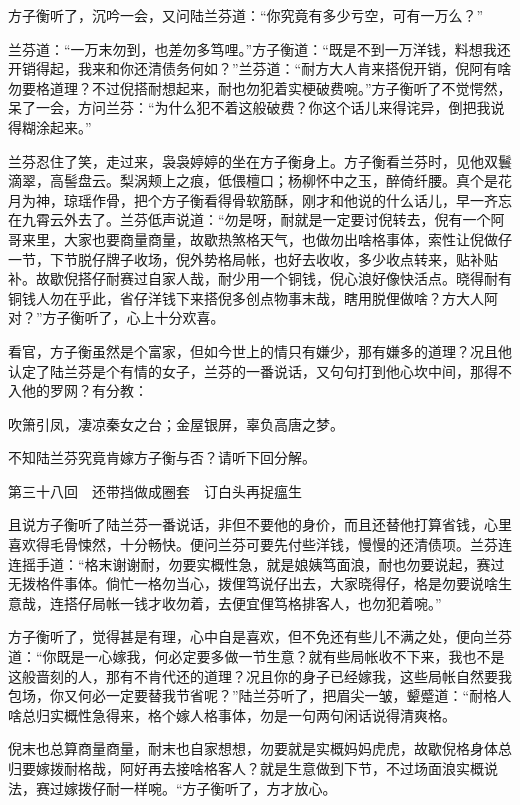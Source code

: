 \documentclass[12pt,UTF8]{ctexbook}
\begin{document}
{{{方子衡听了，沉吟一会，又问陆兰芬道：“你究竟有多少亏空，可有一万么？”

兰芬道：“一万末勿到，也差勿多笃哩。”方子衡道：“既是不到一万洋钱，料想我还开销得起，我来和你还清债务何如？”兰芬道：“耐方大人肯来搭倪开销，倪阿有啥勿要格道理？不过倪搭耐想起来，耐也勿犯着实梗破费啘。”方子衡听了不觉愕然，呆了一会，方问兰芬：“为什么犯不着这般破费？你这个话儿来得诧异，倒把我说得糊涂起来。”

兰芬忍住了笑，走过来，袅袅婷婷的坐在方子衡身上。方子衡看兰芬时，见他双鬟滴翠，高髻盘云。梨涡颊上之痕，低偎檀口；杨柳怀中之玉，醉倚纤腰。真个是花月为神，琼瑶作骨，把个方子衡看得骨软筋酥，刚才和他说的什么话儿，早一齐忘在九霄云外去了。兰芬低声说道：“勿是呀，耐就是一定要讨倪转去，倪有一个阿哥来里，大家也要商量商量，故歇热煞格天气，也做勿出啥格事体，索性让倪做仔一节，下节脱仔牌子收场，倪外势格局帐，也好去收收，多少收点转来，贴补贴补。故歇倪搭仔耐赛过自家人哉，耐少用一个铜钱，倪心浪好像快活点。晓得耐有铜钱人勿在乎此，省仔洋钱下来搭倪多创点物事末哉，瞎用脱俚做啥？方大人阿对？”方子衡听了，心上十分欢喜。

看官，方子衡虽然是个富家，但如今世上的情只有嫌少，那有嫌多的道理？况且他认定了陆兰芬是个有情的女子，兰芬的一番说话，又句句打到他心坎中间，那得不入他的罗网？有分教：

吹箫引凤，凄凉秦女之台；金屋银屏，辜负高唐之梦。

不知陆兰芬究竟肯嫁方子衡与否？请听下回分解。





第三十八回　还带挡做成圈套　订白头再捉瘟生





且说方子衡听了陆兰芬一番说话，非但不要他的身价，而且还替他打算省钱，心里喜欢得毛骨悚然，十分畅快。便问兰芬可要先付些洋钱，慢慢的还清债项。兰芬连连摇手道：“格末谢谢耐，勿要实概性急，就是娘姨笃面浪，耐也勿要说起，赛过无拨格件事体。倘忙一格勿当心，拨俚笃说仔出去，大家晓得仔，格是勿要说啥生意哉，连搭仔局帐一钱才收勿着，去便宜俚笃格排客人，也勿犯着啘。”

方子衡听了，觉得甚是有理，心中自是喜欢，但不免还有些儿不满之处，便向兰芬道：“你既是一心嫁我，何必定要多做一节生意？就有些局帐收不下来，我也不是这般啬刻的人，那有不肯代还的道理？况且你的身子已经嫁我，这些局帐自然要我包场，你又何必一定要替我节省呢？”陆兰芬听了，把眉尖一皱，颦蹙道：“耐格人啥总归实概性急得来，格个嫁人格事体，勿是一句两句闲话说得清爽格。

倪末也总算商量商量，耐末也自家想想，勿要就是实概妈妈虎虎，故歇倪格身体总归要嫁拨耐格哉，阿好再去接啥格客人？就是生意做到下节，不过场面浪实概说法，赛过嫁拨仔耐一样啘。“方子衡听了，方才放心。

}}}
\end{document}
